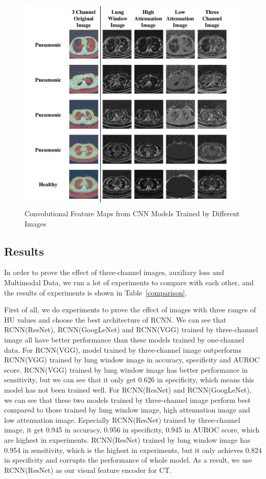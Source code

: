 \documentclass[journal]{IEEEtran}
\begin{document}
\begin{figure}[t]
    \centerline{\includegraphics[width=180mm]{show.pdf}}
    \vspace{-0cm}
    \caption{Convolutional Feature Maps from CNN Models Trained by Different Images}
    \vspace{-0cm}
    \label{show}
    \end{figure}

\subsection{Results}
\label{results}
In order to prove the effect of three-channel images, auxiliary loss and Multimodal Data, we run a lot of experiments to compare with each other, and the results of experiments is shown in Table~\ref{comparison}.

First of all, we do experiments to prove the effect of images with three ranges of HU values and choose the best architecture of RCNN. We can see that RCNN(ResNet), RCNN(GoogLeNet) and RCNN(VGG) trained by three-channel image all have better performance than these models trained by one-channel data. 
For RCNN(VGG), model trained by three-channel image outperforms RCNN(VGG) trained by lung window image in accuracy, specificity and AUROC score. RCNN(VGG) trained by lung window image has better performance in sensitivity, but we can see that it only get 0.626 in specificity, which means this model has not been trained well. 
For RCNN(ResNet) and RCNN(GoogLeNet), we can see that these two models trained by three-channel image perform best compared to those trained by lung window image, high attenuation image and low attenuation image. Especially RCNN(ResNet) trained by three-channel image, it get 0.945 in accuracy, 0.956 in specificity, 0.945 in AUROC score, which are highest in experiments. RCNN(ResNet) trained by lung window image has 0.954 in sensitivity, which is the highest in experiments, but it only achieves 0.824 in specificity and corrupts the performance of whole model. As a result, we use RCNN(ResNet) as our visual feature encoder for CT.
\end{document}
